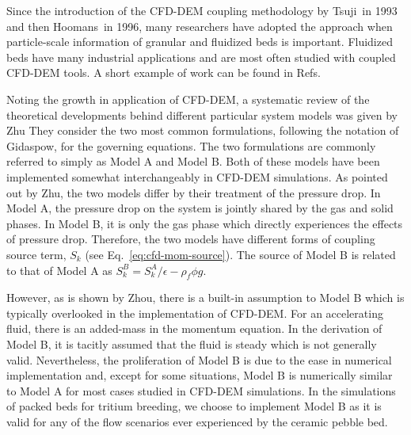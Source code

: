 Since the introduction of the CFD-DEM coupling methodology by Tsuji\etal~in 1993 and then Hoomans\etal~in 1996, many researchers have adopted the approach when particle-scale information of granular and fluidized beds is important.\cite{Tsuji1993,Hoomans1996} Fluidized beds have many industrial applications and are most often studied with coupled CFD-DEM tools. A short example of work can be found in Refs.~\cite{Xu1997,Patankar2001,Swasdisevi2005,Deen2007,Zhang2008,Chu2008,VanBuijtenen2011,Gruber2012,Peng2014}

Noting the growth in application of CFD-DEM, a systematic review of the theoretical developments behind different particular system models was given by Zhu\etal\cite{Zhu2007} They consider the two most common formulations, following the notation of Gidaspow, for the governing equations. The two formulations are commonly referred to simply as Model A and Model B.\cite{gidaspow1994multiphase} Both of these models have been implemented somewhat interchangeably in CFD-DEM simulations. As pointed out by Zhu\etal, the two models differ by their treatment of the pressure drop. In Model A, the pressure drop on the system is jointly shared by the gas and solid phases. In Model B, it is only the gas phase which directly experiences the effects of pressure drop. Therefore, the two models have different forms of coupling source term, $S_k$ (see Eq.~\ref{eq:cfd-mom-source}). The source of Model B is related to that of Model A as $S_k^B = S_k^A/\epsilon - \rho_f\phi g$.

However, as is shown by Zhou\etal, there is a built-in assumption to Model B which is typically overlooked in the implementation of CFD-DEM. For an accelerating fluid, there is an added-mass in the momentum equation. In the derivation of Model B, it is tacitly assumed that the fluid is steady which is not generally valid.\cite{Zhou2010} Nevertheless, the proliferation of Model B is due to the ease in numerical implementation and, except for some situations, Model B is numerically similar to Model A for most cases studied in CFD-DEM simulations.\cite{Zhou2010} In the simulations of packed beds for tritium breeding, we choose to implement Model B as it is valid for any of the flow scenarios ever experienced by the ceramic pebble bed.







